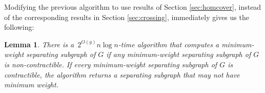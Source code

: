 \documentclass[11pt,twoside]{article}
\newtheorem{lemma}[theorem]{Lemma}
\begin{document}
{Modifying the previous algorithm to use results of Section \ref{sec:homcover}, instead of the corresponding results in Section \ref{sec:crossing}, immediately gives us the following:

\begin{lemma}
\label{lem:global_split-alg2}
There is a~$2^{O(g)} n \log n$-time algorithm that computes a minimum-weight separating subgraph of $G$ if any minimum-weight separating subgraph of $G$ is non-contractible.  If every minimum-weight separating subgraph of $G$ is contractible, the algorithm returns a separating subgraph that may not have minimum weight.
\end{lemma}

%
%
%
%
%
}
\end{document}
